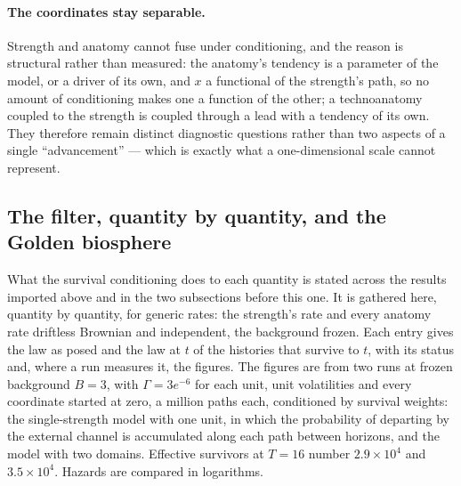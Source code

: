\paragraph{The coordinates stay separable.}\label{gr:rem:separable}
Strength and anatomy cannot fuse under conditioning, and the reason is
structural rather than measured: the anatomy's tendency is a parameter of
the model, or a driver of its own, and $x$ a functional of the strength's
path, so no amount of conditioning makes one a function of the other; a
technoanatomy coupled to the strength is coupled through a lead with a
tendency of its own. They therefore remain distinct diagnostic
questions rather than two aspects of a single ``advancement'' --- which
is exactly what a one-dimensional scale cannot represent.




\subsection{The filter, quantity by quantity, and the Golden biosphere}\label{gr:subsub:exhibit}

What the survival conditioning does to each quantity is stated across the
results imported above and in the two subsections before this one. It is
gathered here, quantity by quantity, for generic rates: the strength's
rate and every anatomy rate driftless Brownian and independent, the
background frozen. Each entry gives the law as posed and the law at $t$ of the histories that
survive to $t$, with its status and, where a run measures it, the
figures.
The figures are from two runs at frozen background $B=3$, with
$\Gamma=3e^{-6}$ for each unit, unit volatilities and every coordinate
started at zero, a million paths each, conditioned by survival weights:
the single-strength model with one unit, in which the probability of
departing by the external channel is accumulated along each path between
horizons, and the model with two domains. Effective survivors at $T=16$
number $2.9\times10^{4}$ and $3.5\times10^{4}$. Hazards are compared in logarithms.

